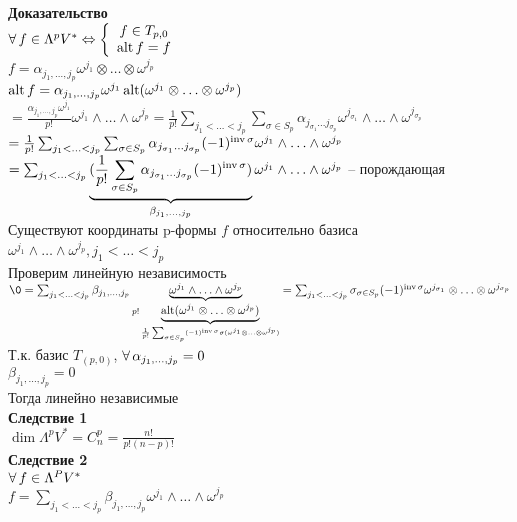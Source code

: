 \documentclass[12pt]{article}
\begin{document}
\textbf{Доказательство}\\
$\fall f \in \Lambda^p V^* \LRto \left\{\begin{array}{cc}
    f\in T_{p,0}\\
    \alt f = f
\end{array}\right.$\\
$f = \alpha_{j_1,\ldots,j_p}\omega^{j_1}\otimes \ldots \otimes \omega^{j_p}$\\
$\alt f = \alpha_{j_1,\ldots,j_p}\omega^{j_1} \alt(\omega^{j_1}\otimes \ldots \otimes \omega^{j_p})$\\
$ = \frac{\alpha_{j_1,\ldots,j_p}\omega^{j_1}}{p!}\omega^{j_1}\land \ldots \land \omega^{j_p} = \frac1{p!}\sum_{j_1<\ldots<j_p} \sum_{\sigma \in S_p} \alpha_{j_{\sigma_1}\ldots j_{\sigma_p}}\omega^{j_{\sigma_1}}\land \ldots \land \omega^{j_{\sigma_p}}$\\
$ = \frac1{p!}\sum_{j_1<\ldots<j_p} \sum_{\sigma \in S_p} \alpha_{j_{\sigma_1}\ldots j_{\sigma_p}}(-1)^{\inv\sigma}\omega^{j_1}\land \ldots \land \omega^{j_p}$\\
$ = \sum_{j_1<\ldots<j_p} \ub{\beta_{j_1,\ldots,j_p}}{(\frac1{p!}\sum_{\sigma \in S_p} \alpha_{j_{\sigma_1}\ldots j_{\sigma_p}}(-1)^{\inv\sigma})}\omega^{j_1}\land \ldots \land \omega^{j_p}$ -- порождающая\\
Существуют координаты p-формы $f$ относительно базиса $\omega^{j_1}\land \ldots \land \omega^{j_p}, j_1<\ldots<j_p$\\
Проверим линейную независимость\\
$\0 = \sum_{j_1<\ldots<j_p}\beta_{j_1,\ldots,j_p}\ub{p!\ub{\frac1{p!}\sum_{\sigma\in S_p}(-1)^{\inv \sigma}\sigma(\omega^{j_1}\otimes\ldots\otimes\omega^{j_p})}{\alt(\omega^{j_1}\otimes \ldots\otimes\omega^{j_p})}}{\omega^{j_1}\land\ldots\land\omega^{j_p}} = \sum_{j_1<\ldots<j_p} \sigma_{\sigma\in S_p}(-1)^{\inv \sigma} \omega^{j_{\sigma_1}} \otimes \ldots \otimes \omega^{j_{\sigma_p}}$\\
Т.к. базис $T_{(p,0)}$, $\fall \alpha_{j_1,\ldots,j_p} = 0$\\
$\beta_{j_1,\ldots,j_p} = 0$\\
Тогда линейно независимые\\
\textbf{Следствие 1}\\
$\dim \Lambda^pV^* = C_n^p = \frac{n!}{p!(n-p)!}$\\
\textbf{Следствие 2}\\
$\fall f \in \Lambda^P V^*$\\
$f = \sum_{j_1<\ldots<j_p} \beta_{j_1,\ldots,j_p} \omega^{j_1}\land \ldots\land \omega^{j_p}$\\
\end{document}
